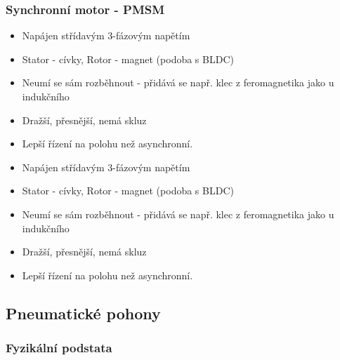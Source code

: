 \subsubsection*{Synchronní motor - PMSM}
\begin{itemize}
  \item Napájen střídavým 3-fázovým napětím
  \item Stator - cívky, Rotor - magnet (podoba s BLDC)
  \item Neumí se sám rozběhnout - přidává se např. klec z feromagnetika jako u indukčního
  \item Dražší, přesnější, nemá skluz
  \item Lepší řízení na polohu než asynchronní.
    \item Napájen střídavým 3-fázovým napětím
    \item Stator - cívky, Rotor - magnet (podoba s BLDC)
    \item Neumí se sám rozběhnout - přidává se např. klec z feromagnetika jako u indukčního
    \item Dražší, přesnější, nemá skluz
    \item Lepší řízení na polohu než asynchronní.
\end{itemize}

\subsection{Pneumatické pohony}
\subsubsection*{Fyzikální podstata}

